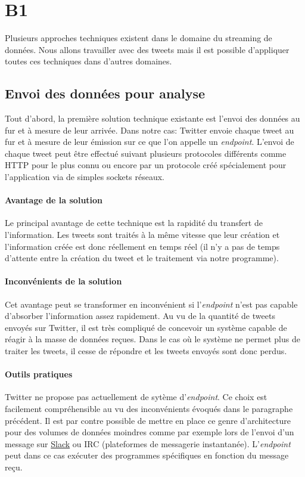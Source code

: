 \section{B1}
\label{sec:B1}

Plusieurs approches techniques existent dans le domaine du streaming de données. Nous allons travailler avec des tweets mais il est possible d'appliquer toutes ces techniques dans d'autres domaines.\\

\subsection{Envoi des données pour analyse}
\label{sub:Envoi des données pour analyse}

  Tout d'abord, la première solution technique existante est l'envoi des données au fur et à mesure de leur arrivée. Dans notre cas: Twitter envoie chaque tweet au fur et à mesure de leur émission sur ce que l'on appelle un \textit{endpoint}. L'envoi de chaque tweet peut être effectué suivant plusieurs protocoles différents comme HTTP pour le plus connu ou encore par un protocole créé spécialement pour l'application via de simples sockets réseaux.\\

  \paragraph{Avantage de la solution}
  Le principal avantage de cette technique est la rapidité du transfert de l'information. Les tweets sont traités à la même vitesse que leur création et l'information créée est donc réellement en temps réel (il n'y a pas de temps d'attente entre la création du tweet et le traitement via notre programme).

  \paragraph{Inconvénients de la solution}
  Cet avantage peut se transformer en inconvénient si l'\textit{endpoint} n'est pas capable d'absorber l'information assez rapidement. Au vu de la quantité de tweets envoyés sur Twitter, il est très compliqué de concevoir un système capable de réagir à la masse de données reçues. Dans le cas où le système ne permet plus de traiter les tweets, il cesse de répondre et les tweets envoyés sont donc perdus.

  \paragraph{Outils pratiques}
  Twitter ne propose pas actuellement de sytème d'\textit{endpoint}. Ce choix est facilement compréhensible au vu des inconvénients évoqués dans le paragraphe précédent. Il est par contre possible de mettre en place ce genre d'architecture pour des volumes de données moindres comme par exemple lors de l'envoi d'un message sur \href{https://slack.com/}{Slack} ou IRC (plateformes de messagerie instantanée). L'\textit{endpoint} peut dans ce cas exécuter des programmes spécifiques en fonction du message reçu.

